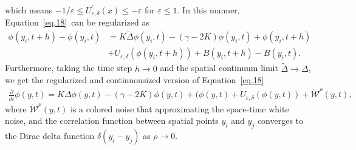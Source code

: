 \documentclass[11pt]{article}
\numberwithin{equation}{section}%
\numberwithin{figure}{section}%
\theoremstyle{remark}
\begin{document}
	which means $-1/\varepsilon\leq U^{\prime}_{\varepsilon,\delta}(x)\leq -\varepsilon$ for $\varepsilon\leq 1$.	In this manner, Equation~\eqref{eq.18}~can be regularized as 
	\begin{align*}
		\phi(y_{i},t+h)-\phi(y_{i},t)&=K\tilde{\Delta } \phi(y_{i},t)-(\gamma-2K)\phi(y_{i},t)+\phi(y_{i},t+h)\\
		&+U_{\varepsilon,\delta}(\phi(y_{i},t+h))+B(y_{i},t+h)-B(y_{i},t).
	\end{align*}
	 Furthermore, taking the time step $h\rightarrow 0$ and the spatial continuum limit $\tilde{\Delta }\rightarrow\Delta $, we get the regularized and continuousized version of Equation~\eqref{eq.18}
	\begin{align*}
		\frac{\partial}{\partial t}\phi(y,t)=K\Delta \phi(y,t)-(\gamma-2K)\phi(y,t)+(\phi(y,t)+U_{\varepsilon,\delta}(\phi(y,t))+\dot{\mathcal{W}}^{\rho}(y,t),
	\end{align*}	
	where $\dot{\mathcal{W}}^{\rho}(y,t)$ is a colored noise that approximating the space-time white noise, and the correlation function between spatial points $y_{i}$ and $y_{j}$ converges to the Dirac delta function $\delta(y_{i}-y_{j})$ as $\rho\rightarrow0$.	
	
\end{document}
